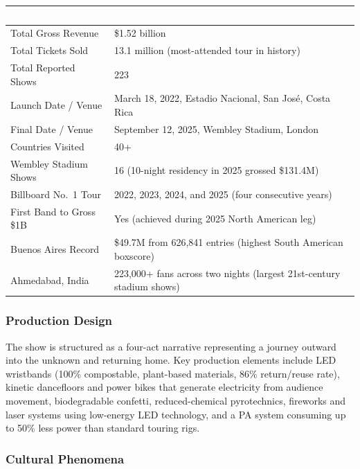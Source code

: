 \documentclass[11pt,letterpaper]{article}
\newcommand{\tableheader}[1]{\textbf{\sffamily\textcolor{white}{#1}}}
\begin{document}
\begin{center}
\begin{tabularx}{\textwidth}{L{5cm}X}
\toprule
{}
\tableheader{Metric} & \tableheader{Value} \\
\midrule
Total Gross Revenue & \$1.52 billion \\
Total Tickets Sold & 13.1 million (most-attended tour in history) \\
Total Reported Shows & 223 \\
Launch Date / Venue & March 18, 2022, Estadio Nacional, San José, Costa Rica \\
Final Date / Venue & September 12, 2025, Wembley Stadium, London \\
Countries Visited & 40+ \\
Wembley Stadium Shows & 16 (10-night residency in 2025 grossed \$131.4M) \\
Billboard No.\ 1 Tour & 2022, 2023, 2024, and 2025 (four consecutive years) \\
First Band to Gross \$1B & Yes (achieved during 2025 North American leg) \\
Buenos Aires Record & \$49.7M from 626,841 entries (highest South American boxscore) \\
Ahmedabad, India & 223,000+ fans across two nights (largest 21st-century stadium shows) \\
\bottomrule
\end{tabularx}
\end{center}

\subsubsection{Production Design}

The show is structured as a four-act narrative representing a journey outward into the unknown and returning home. Key production elements include LED wristbands (100\% compostable, plant-based materials, 86\% return/reuse rate), kinetic dancefloors and power bikes that generate electricity from audience movement, biodegradable confetti, reduced-chemical pyrotechnics, fireworks and laser systems using low-energy LED technology, and a PA system consuming up to 50\% less power than standard touring rigs.

\subsubsection{Cultural Phenomena}
\end{document}
